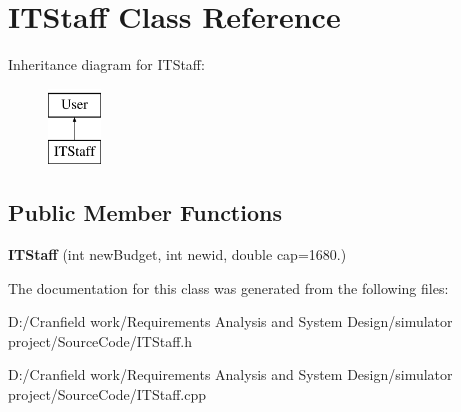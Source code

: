 \hypertarget{class_i_t_staff}{}\section{I\+T\+Staff Class Reference}
\label{class_i_t_staff}
Inheritance diagram for I\+T\+Staff\+:\begin{figure}[H]
\begin{center}
\leavevmode
\includegraphics[height=2.000000cm]{class_i_t_staff}
\end{center}
\end{figure}
\subsection*{Public Member Functions}
\begin{DoxyCompactItemize}
\item 
\mbox{\label{class_i_t_staff_a25ca02a72692ff5ed0c97f0c23415381}} 
{\bfseries I\+T\+Staff} (int new\+Budget, int newid, double cap=1680.)
\end{DoxyCompactItemize}


The documentation for this class was generated from the following files\+:\begin{DoxyCompactItemize}
\item 
D\+:/\+Cranfield work/\+Requirements Analysis and System Design/simulator project/\+Source\+Code/I\+T\+Staff.\+h\item 
D\+:/\+Cranfield work/\+Requirements Analysis and System Design/simulator project/\+Source\+Code/I\+T\+Staff.\+cpp\end{DoxyCompactItemize}
